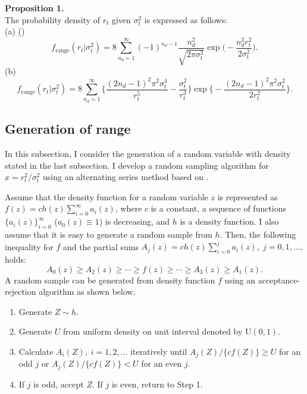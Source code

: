 \documentclass[11pt]{article}
\begin{document}
\noindent
{\bf Proposition 1.} \\
The probability density of $r_t$ given $\sigma^2_t$ is expressed as follows: \\
(a) (\cite{Feller(1951)})
\[
f_{\mathrm{range}}(r_t|\sigma^2_t) =8\sum_{n_d=1}^\infty (-1)^{n_d-1} \frac{n_d^2}{\sqrt{2\pi\sigma_t^2}}\exp\bigg( -\frac{n_d^2r_t^2}{2\sigma_t^2} \bigg).
\]
(b)
\[
f_{\mathrm{range}}(r_t|\sigma^2_t) =8\sum_{n_d=1}^\infty \bigg\{ \frac{(2n_d-1)^2\pi^2\sigma_t^4}{r_t^5} -\frac{\sigma_t^2}{r_t^3} \bigg\} 
\exp\bigg\{ -\frac{(2n_d-1)^2\pi^2\sigma_t^2}{2r_t^2} \bigg\}.
\]



\subsection{Generation of range}
In this subsection,  I consider the generation of a random variable with density stated in the last subsection.
I develop a random sampling algorithm for $x=r_t^2/\sigma_t^2$ using an alternating series method based on \cite{Devroye(1986)}.

Assume that the density function for a random variable $z$ is represented as $f(z)=ch(z)\sum_{i=0}^\infty a_i(z)$, 
where $c$ is a constant, 
a sequence of functions $\{a_i(z)\}_{i=0}^\infty$ ($a_0(z)\equiv 1$) is decreasing, 
and $h$ is a density function.
I also assume that it is easy to generate a random sample from $h$. 
Then, the following inequality for $f$ and the partial sums $A_j(z) =ch(z)\sum_{i=0}^j a_i(z), \; j=0, 1, \ldots,$ holds: 
\[
A_0(z) \ge A_2(z) \ge \cdots \ge f(z) \ge \cdots \ge A_3(z) \ge A_1(z).
\]
A random sample can be generated from density function $f$ using an acceptance-rejection algorithm as shown below. 
\begin{enumerate}
\item 
Generate $Z \sim h$.
\item 
Generate $U$ from uniform density on unit interval denoted by $\mathrm{U}(0,1)$. 
\item 
Calculate $A_i(Z), \; i=1, 2, \ldots$ iteratively until $A_j(Z)/\{cf(Z)\}\ge U$ for an odd $j$ or $A_j(Z)/\{cf(Z)\}< U$ for an even $j$.
\item 
If $j$ is odd, accept $Z$. If $j$ is even, return to Step 1.
\end{enumerate}

\vspace{0.5\baselineskip}
\end{document}
